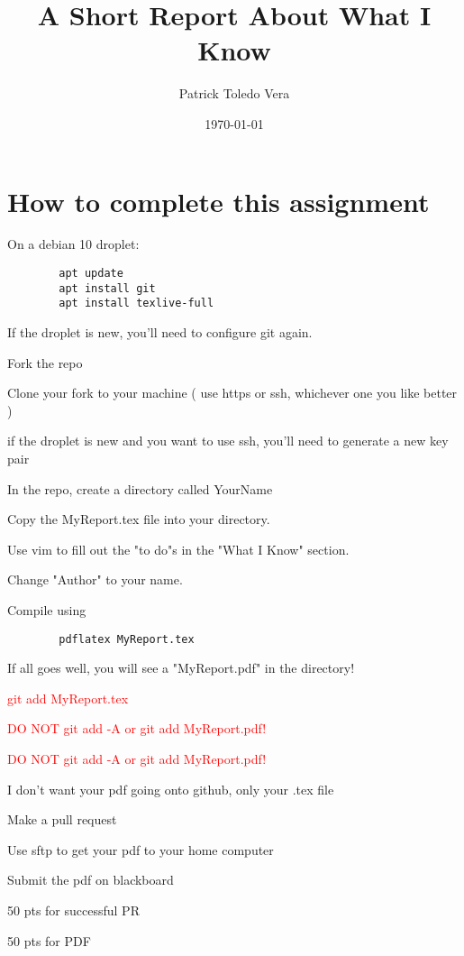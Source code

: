 \documentclass[11pt]{article}
\title{A Short Report About What I Know}
\author{ Patrick Toledo Vera }
\date{\today}
\begin{document}
\maketitle	

\section*{How to complete this assignment}
\begin{todolist}
    \item On a debian 10 droplet:
    \begin{verbatim}
        apt update
        apt install git
        apt install texlive-full
    \end{verbatim}
    \item If the droplet is new, you'll need to configure git again.
    \item Fork the repo
    \item Clone your fork to your machine ( use https or ssh, whichever one you like better )
    \item if the droplet is new and you want to use ssh, you'll need to generate a new key pair
    \item In the repo, create a directory called YourName
    \item Copy the MyReport.tex file into your directory.
    \item Use vim to fill out the "to do"s in the "What I Know" section.
    \item Change "Author" to your name.
    \item Compile using
    \begin{verbatim}
        pdflatex MyReport.tex
    \end{verbatim}
    \item If all goes well, you will see a "MyReport.pdf" in the directory!
    \item \textcolor{red}{ git add MyReport.tex}
    \item {\Large\textcolor{red}{ DO NOT git add -A or git add MyReport.pdf!}}
    \item {\LARGE\textcolor{red}{ DO NOT git add -A or git add MyReport.pdf!}}
    \item I don't want your pdf going onto github, only your .tex  file
    \item Make a pull request
    \item Use sftp to get your pdf to your home computer
    \item Submit the pdf on blackboard
    \item 50 pts for successful PR
    \item 50 pts for PDF
\end{todolist}
\end{document}
